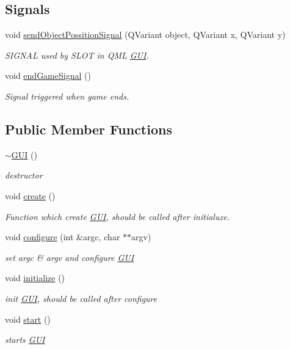 \subsection*{Signals}
\begin{DoxyCompactItemize}
\item 
void \hyperlink{class_g_u_i_a65e8a6aae95d7886ff4904c5bdafd456}{send\+Object\+Possition\+Signal} (Q\+Variant object, Q\+Variant x, Q\+Variant y)
\begin{DoxyCompactList}\small\item\em S\+I\+G\+N\+A\+L used by S\+L\+O\+T in Q\+M\+L \hyperlink{class_g_u_i}{G\+U\+I}. \end{DoxyCompactList}\item 
void \hyperlink{class_g_u_i_aa43572496811fb329819369bc958868b}{end\+Game\+Signal} ()
\begin{DoxyCompactList}\small\item\em Signal triggered when game ends. \end{DoxyCompactList}\end{DoxyCompactItemize}
\subsection*{Public Member Functions}
\begin{DoxyCompactItemize}
\item 
\hyperlink{class_g_u_i_ac9cae2328dcb5d83bdfaeca49a2eb695}{$\sim$\+G\+U\+I} ()
\begin{DoxyCompactList}\small\item\em destructor \end{DoxyCompactList}\item 
void \hyperlink{class_g_u_i_acae178ada7d9c239dd8007bb86051db6}{create} ()
\begin{DoxyCompactList}\small\item\em Function which create \hyperlink{class_g_u_i}{G\+U\+I}, should be called after initialuze. \end{DoxyCompactList}\item 
void \hyperlink{class_g_u_i_aa9eeebe65d31fac581e474af4214bf0a}{configure} (int \&argc, char $\ast$$\ast$argv)
\begin{DoxyCompactList}\small\item\em set argc \& argv and configure \hyperlink{class_g_u_i}{G\+U\+I} \end{DoxyCompactList}\item 
void \hyperlink{class_g_u_i_a19525b333677953bbc2df2639e2aa82c}{initialize} ()
\begin{DoxyCompactList}\small\item\em init \hyperlink{class_g_u_i}{G\+U\+I}, should be called after configure \end{DoxyCompactList}\item 
void \hyperlink{class_g_u_i_a5f00ff7017a733d8e5489c99d041ad58}{start} ()
\begin{DoxyCompactList}\small\item\em starts \hyperlink{class_g_u_i}{G\+U\+I} \end{DoxyCompactList}\end{DoxyCompactItemize}
